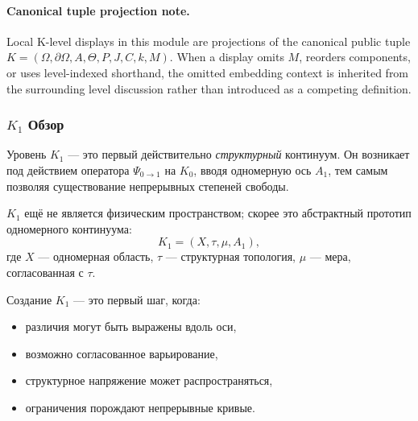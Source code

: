 



\paragraph{Canonical tuple projection note.}
Local K-level displays in this module are projections of the canonical public tuple \(K=(\Omega,\partial\Omega,A,\Theta,P,J,C,k,M)\). When a display omits \(M\), reorders components, or uses level-indexed shorthand, the omitted embedding context is inherited from the surrounding level discussion rather than introduced as a competing definition.

\subsubsection{\texorpdfstring{$K_1$}{K_1} Обзор}
\label{sec:k1-overview}

Уровень $K_1$ — это первый действительно
\emph{структурный} континуум.
Он возникает под действием оператора $\Psi_{0\to1}$ на $K_0$,
вводя одномерную ось $A_1$, тем самым позволяя существование
непрерывных степеней свободы.

$K_1$ ещё не является физическим пространством; скорее это абстрактный
прототип одномерного континуума:
\[
K_1 = (X, \tau, \mu, A_1),
\]
где $X$ — одномерная область, $\tau$ — структурная
топология, $\mu$ — мера, согласованная с $\tau$.

Создание $K_1$ — это первый шаг, когда:
\begin{itemize}
    \item различия могут быть выражены вдоль оси,
    \item возможно согласованное варьирование,
    \item структурное напряжение может распространяться,
    \item ограничения порождают непрерывные кривые.
\end{itemize}

